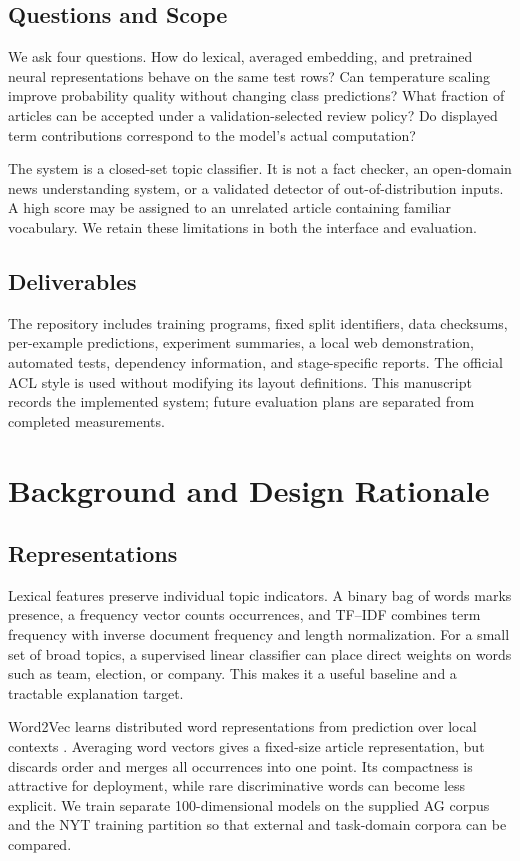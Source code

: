 \documentclass[11pt]{article}
\begin{document}
\subsection{Questions and Scope}
We ask four questions. How do lexical, averaged embedding, and pretrained neural representations behave on the same test rows? Can temperature scaling improve probability quality without changing class predictions? What fraction of articles can be accepted under a validation-selected review policy? Do displayed term contributions correspond to the model's actual computation?

The system is a closed-set topic classifier. It is not a fact checker, an open-domain news understanding system, or a validated detector of out-of-distribution inputs. A high score may be assigned to an unrelated article containing familiar vocabulary. We retain these limitations in both the interface and evaluation.

\subsection{Deliverables}
The repository includes training programs, fixed split identifiers, data checksums, per-example predictions, experiment summaries, a local web demonstration, automated tests, dependency information, and stage-specific reports. The official ACL style is used without modifying its layout definitions. This manuscript records the implemented system; future evaluation plans are separated from completed measurements.
\clearpage
\section{Background and Design Rationale}
\subsection{Representations}
Lexical features preserve individual topic indicators. A binary bag of words marks presence, a frequency vector counts occurrences, and TF--IDF combines term frequency with inverse document frequency and length normalization. For a small set of broad topics, a supervised linear classifier can place direct weights on words such as team, election, or company. This makes it a useful baseline and a tractable explanation target.

Word2Vec learns distributed word representations from prediction over local contexts \citep{mikolov2013}. Averaging word vectors gives a fixed-size article representation, but discards order and merges all occurrences into one point. Its compactness is attractive for deployment, while rare discriminative words can become less explicit. We train separate 100-dimensional models on the supplied AG corpus and the NYT training partition so that external and task-domain corpora can be compared.
\end{document}
